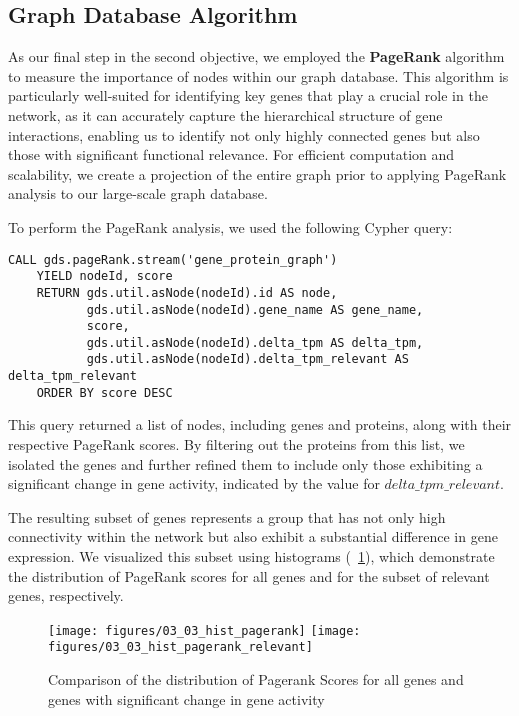 \subsection{Graph Database Algorithm} \label{subsec:graph_database_algo}



As our final step in the second objective,
we employed the \textbf{PageRank} algorithm to measure the importance of nodes within our graph database.
This algorithm is particularly well-suited for identifying key genes that play a crucial role in the network,
as it can accurately capture the hierarchical structure of gene interactions,
enabling us to identify not only highly connected genes but also those with significant functional relevance.
For efficient computation and scalability,
we create a projection of the entire graph prior to applying PageRank analysis to our large-scale graph database.

To perform the PageRank analysis, we used the following Cypher query:
\begin{lstlisting}[language=Cypher, label={lst:pagerank}]
    CALL gds.pageRank.stream('gene_protein_graph')
    YIELD nodeId, score
    RETURN gds.util.asNode(nodeId).id AS node,
           gds.util.asNode(nodeId).gene_name AS gene_name,
           score,
           gds.util.asNode(nodeId).delta_tpm AS delta_tpm,
           gds.util.asNode(nodeId).delta_tpm_relevant AS delta_tpm_relevant
    ORDER BY score DESC
\end{lstlisting}

This query returned a list of nodes, including genes and proteins, along with their respective PageRank scores.
By filtering out the proteins from this list, we isolated the genes and
further refined them to include only those exhibiting a significant change in gene activity,
indicated by the value for $delta\_tpm\_relevant$.

The resulting subset of genes represents a group that has not only high connectivity
within the network but also exhibit a substantial difference in gene expression.
We visualized this subset using histograms (~\cref{fig:03_02_hist_pagerank}),
which demonstrate the distribution of PageRank scores for all genes and for the subset of relevant genes, respectively.

\begin{figure}[h]
        \texttt{[image: figures/03\_03\_hist\_pagerank]}
    \endminipage
    \hfill
      \texttt{[image: figures/03\_03\_hist\_pagerank\_relevant]}
    \endminipage
    \caption{Comparison of the distribution of Pagerank Scores for all genes and genes with significant change in gene activity}
    \label{fig:03_02_hist_pagerank}
\end{figure}
